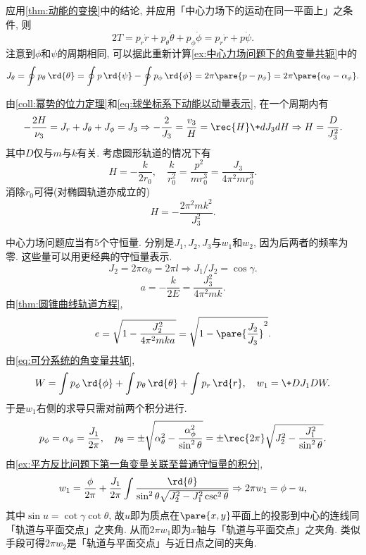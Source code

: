 \documentclass[../TheoreticalMechanics.tex]{subfiles}
\begin{document}
\begin{ex}
    应用\cref{thm:动能的变换}中的结论, 并应用「中心力场下的运动在同一平面上」之条件, 则
    \begin{equation}
        \label{eq:球坐标系下动能以动量表示}
        2T = p_r\dot{r} + p_\theta\dot{\theta} + p_\phi \dot{\phi} = p_r\dot{r} + p\dot{\psi}. 
    \end{equation}
    注意到$\phi$和$\psi$的周期相同, 可以据此重新计算\cref{ex:中心力场问题下的角变量共轭}中的
    \[ J_\theta = \oint p_\theta\,\rd{\theta} = \oint p\,\rd{\psi} - \oint p_\phi\,\rd{\phi}  = 2\pi\pare{p-p_\phi} = 2\pi\pare{\alpha_\theta - \alpha_\phi}. \]
\end{ex}
\begin{ex}[闭合轨道条件]
    由\cref{coll:幂势的位力定理}和\eqref{eq:球坐标系下动能以动量表示}, 在一个周期内有
    \[ -\frac{2H}{\nu_3} = J_r + J_\theta + J_\phi = J_3 \Rightarrow -\frac{2}{J_3} = \frac{v_3}{H} = \rec{H}\+d{J_3}dH \Rightarrow H = \frac{D}{J_3^2}. \]
    其中$D$仅与$m$与$k$有关. 考虑圆形轨道的情况下有
    \[ H = -\frac{k}{2r_0},\quad \frac{k}{r_0^2} = \frac{p^2}{mr_0^3} = \frac{J_3}{4\pi^2mr_0^3}. \]
    消除$r_0$可得(对椭圆轨道亦成立的)
    \[ H = -\frac{2\pi^2mk^2}{J_3^2}. \]
\end{ex}
\begin{ex}
    中心力场问题应当有$5$个守恒量. 分别是$J_1,J_2,J_3$与$w_1$和$w_2$, 因为后两者的频率为零. 这些量可以用更经典的守恒量表示.
    \[ J_2 = 2\pi\alpha_\theta = 2\pi l \Rightarrow J_1/J_2 = \cos \gamma. \]
    \[ a = -\frac{k}{2E} = \frac{J_3^2}{4\pi^2mk}. \]
    由\cref{thm:圆锥曲线轨道方程},
    \[ e = \sqrt{1-\frac{J_2^2}{4\pi^2mka}} = \sqrt{1-\pare{\frac{J_2}{J_3}}^2}. \]
    由\eqref{eq:可分系统的角变量共轭},
    \[ W = \int p_\phi\,\rd{\phi} + \int p_\theta\,\rd{\theta} + \int p_r\,\rd{r},\quad w_1 = \+D{J_1}DW. \]
    于是$w_1$右侧的求导只需对前两个积分进行.
    \[ p_\phi = \alpha_\phi = \frac{J_1}{2\pi},\quad p_\theta = \pm\sqrt{\alpha_\theta^2 - \frac{\alpha_\phi^2}{\sin^2\theta}} = \pm\rec{2\pi}\sqrt{J_2^2 - \frac{J_1^2}{\sin^2\theta}}. \]
    由\cref{ex:平方反比问题下第一角变量关联至普通守恒量的积分},
    \[ w_1 = \frac{\phi}{2\pi} + \frac{J_1}{2\pi}\int \frac{\rd{\theta}}{\sin^2\theta\sqrt{J_2^2 - J_1^2\csc^2\theta}}\Rightarrow 2\pi w_1 = \phi - u, \]
    其中$\sin u = \cot\gamma\cot\theta$, 故$u$即为质点在$\pare{x,y}$平面上的投影到中心的连线同「轨道与平面交点」之夹角. 从而$2\pi w_1$即为$x$轴与「轨道与平面交点」之夹角. 类似手段可得$2\pi w_2$是「轨道与平面交点」与近日点之间的夹角.
\end{ex}



\end{document}

